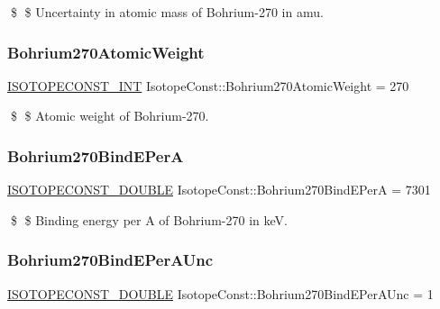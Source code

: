 \$ \$ Uncertainty in atomic mass of Bohrium-\/270 in amu. \mbox{\label{group___isotope_const-_bohrium-_bh270_gab921285e894f3b56a81848b41a9f1253}} 
\subsubsection{\texorpdfstring{Bohrium270\+Atomic\+Weight}{Bohrium270AtomicWeight}}
{\footnotesize\ttfamily \mbox{\hyperlink{group___isotope_const-_macros_ga5f18360b3e99483a35c32d789e62621c}{I\+S\+O\+T\+O\+P\+E\+C\+O\+N\+S\+T\+\_\+\+I\+NT}} Isotope\+Const\+::\+Bohrium270\+Atomic\+Weight = 270}

\$ \$ Atomic weight of Bohrium-\/270. \mbox{\label{group___isotope_const-_bohrium-_bh270_ga607ae8bec87ce845c13e411fb093bb6b}} 
\subsubsection{\texorpdfstring{Bohrium270\+Bind\+E\+PerA}{Bohrium270BindEPerA}}
{\footnotesize\ttfamily \mbox{\hyperlink{group___isotope_const-_macros_ga8f45a7272ce02c0b4c65c44636ed719a}{I\+S\+O\+T\+O\+P\+E\+C\+O\+N\+S\+T\+\_\+\+D\+O\+U\+B\+LE}} Isotope\+Const\+::\+Bohrium270\+Bind\+E\+PerA = 7301}

\$ \$ Binding energy per A of Bohrium-\/270 in keV. \mbox{\label{group___isotope_const-_bohrium-_bh270_ga21c9ec4774d2a02a958049d1ab8ec5c0}} 
\subsubsection{\texorpdfstring{Bohrium270\+Bind\+E\+Per\+A\+Unc}{Bohrium270BindEPerAUnc}}
{\footnotesize\ttfamily \mbox{\hyperlink{group___isotope_const-_macros_ga8f45a7272ce02c0b4c65c44636ed719a}{I\+S\+O\+T\+O\+P\+E\+C\+O\+N\+S\+T\+\_\+\+D\+O\+U\+B\+LE}} Isotope\+Const\+::\+Bohrium270\+Bind\+E\+Per\+A\+Unc = 1}

